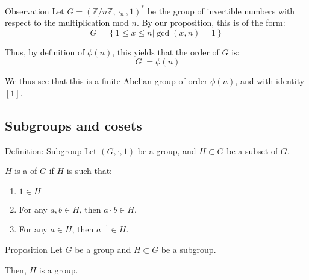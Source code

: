 \documentclass[a4paper]{article}
\begin{document}
\begin{parag}{Observation}
    Let $G = \left(\mathbb{Z}/{n}\mathbb{Z}, \cdot_n, 1\right)^*$ be the group of invertible numbers with respect to the multiplication mod $n$. By our proposition, this is of the form:
    \[G = \left\{1 \leq x \leq n | \gcd\left(x, n\right) = 1\right\}\]

    Thus, by definition of $\phi\left(n\right)$, this yields that the order of $G$ is: 
    \[\left|G\right| = \phi\left(n\right)\]
    
    We thus see that this is a finite Abelian group of order $\phi\left(n\right)$, and with identity $\left[1\right]$.
\end{parag}

\subsection{Subgroups and cosets}

\begin{parag}{Definition: Subgroup}
    Let $\left(G, \cdot, 1 \right)$ be a group, and $H \subset G$ be a subset of $G$.

    $H$ is a  of $G$ if $H$ is such that:
    \begin{enumerate}
        \item $1 \in H$
        \item For any $a, b \in H$, then $a\cdot b \in H$.
        \item For any $a \in H$, then $a^{-1} \in H$.
    \end{enumerate}
\end{parag}

\begin{parag}{Proposition}
    Let $G$ be a group and $H \subset G$ be a subgroup. 

    Then, $H$ is a group.
\end{parag}
\end{document}
